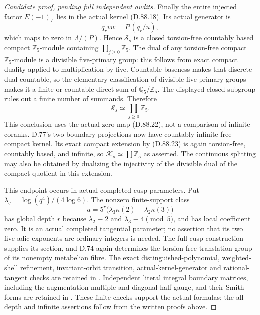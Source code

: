 \begin{proof}[Candidate proof, pending full independent audits]
Finally the entire injected factor \(E(-1)_\Gamma\) lies in
the actual kernel (D.88.18). Its actual generator is
\[
                     q_rvw=P\,(q_r/u),                 \tag{D.88.22}
\]
which maps to zero in \(\Lambda/(P)\). Hence
\(\mathcal S_s\) is a closed torsion-free countably based
compact \(\mathbb Z_5\)-module containing
\(\prod_{j\ge0}\mathbb Z_5\). The dual of any torsion-free
compact \(\mathbb Z_5\)-module is a divisible five-primary
group: this follows from exact compact duality applied to
multiplication by five. Countable baseness makes that discrete
dual countable, so the elementary classification of divisible
five-primary groups makes it a finite or countable direct sum
of \(\mathbb Q_5/\mathbb Z_5\). The displayed closed subgroup
rules out a finite number of summands. Therefore
\[
                    \mathcal S_s\simeq\prod_{j\ge0}\mathbb Z_5.
                                                               \tag{D.88.23}
\]
This conclusion uses the actual zero map (D.88.22), not a
comparison of infinite coranks. D.77's two boundary projections
now have countably infinite free compact kernel. Its exact
compact extension by (D.88.23) is again torsion-free, countably
based, and infinite, so \(\mathcal K_s\simeq\prod\mathbb Z_5\)
as asserted. The continuous splitting may also be obtained by
dualizing the injectivity of the divisible dual of the compact
quotient in this extension.

This endpoint occurs in actual completed cusp parameters. Put
\(\lambda_q=\log(q^4)/(4\log6)\). The nonzero finite-support
class
\[
          a=5^r\bigl(\lambda_3\kappa(2)
                         -\lambda_2\kappa(3)\bigr)    \tag{D.88.24}
\]
has global depth \(r\) because \(\lambda_2\equiv2\) and
\(\lambda_3\equiv4\pmod5\), and has local coefficient zero.
It is an actual completed tangential parameter; no assertion
that its two five-adic exponents are ordinary integers is needed.
The full cusp construction supplies its section, and D.74
again determines the torsion-free translation group of its
nonempty metabelian fibre.
The exact distinguished-polynomial, weighted-shell refinement,
invariant-orbit transition, actual-kernel-generator and rational-tangent
checks are retained in
. Independent
literal integral boundary matrices, including the augmentation
multiple and diagonal half gauge, and their Smith forms are retained in
. These finite checks
support the actual formulas; the all-depth and infinite assertions
follow from the written proofs above.
\end{proof}
